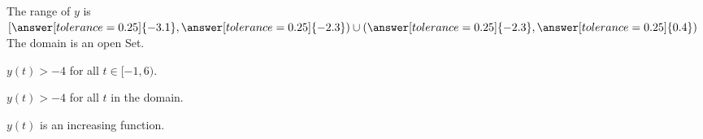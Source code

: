 \documentclass{ximera}
\begin{document}
\begin{exercise}
\begin{question}
The range of $y$ is  $\left[ \answer[tolerance=0.25]{-3.1}, \answer[tolerance=0.25]{-2.3} \right) \cup  \left( \answer[tolerance=0.25]{-2.3}, \answer[tolerance=0.25]{0.4} \right) $   \\


The domain is an open Set.
\begin{multipleChoice}
\end{multipleChoice}


\end{question}









\begin{question} 



$y(t) > -4$ for all $t \in [-1, 6)$.
\begin{multipleChoice}
\end{multipleChoice}

\end{question}








\begin{question} 



$y(t) > -4$ for all $t$ in the domain. 
\begin{multipleChoice}
\end{multipleChoice}

\end{question}







\begin{question} 



$y(t)$ is an increasing function.
\begin{multipleChoice}
\end{multipleChoice}

\end{question}





\begin{question} 




\end{question}
\end{exercise}
\end{document}
